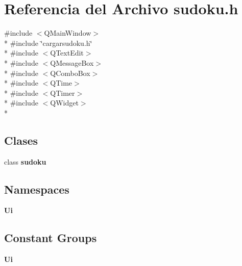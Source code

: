 \section{Referencia del Archivo sudoku.\-h}
\label{sudoku_8h}
{\ttfamily \#include $<$Q\-Main\-Window$>$}\\*
{\ttfamily \#include \char`\"{}cargarsudoku.\-h\char`\"{}}\\*
{\ttfamily \#include $<$Q\-Text\-Edit$>$}\\*
{\ttfamily \#include $<$Q\-Message\-Box$>$}\\*
{\ttfamily \#include $<$Q\-Combo\-Box$>$}\\*
{\ttfamily \#include $<$Q\-Time$>$}\\*
{\ttfamily \#include $<$Q\-Timer$>$}\\*
{\ttfamily \#include $<$Q\-Widget$>$}\\*
\subsection*{Clases}
\begin{DoxyCompactItemize}
\item 
class {\bf sudoku}
\end{DoxyCompactItemize}
\subsection*{Namespaces}
\begin{DoxyCompactItemize}
\item 
{\bf Ui}
\end{DoxyCompactItemize}
\subsection*{Constant Groups}
\begin{DoxyCompactItemize}
\item 
{\bf Ui}
\end{DoxyCompactItemize}
